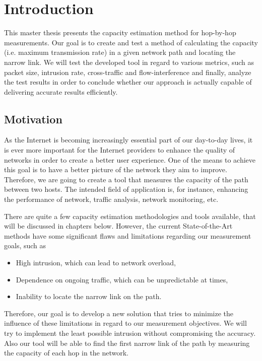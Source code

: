 \chapter{Introduction}
This master thesis presents the capacity estimation method for hop-by-hop measurements. Our goal is to create and test a method of calculating the capacity (i.e. maximum transmission rate) in a given network path and locating the narrow link.
We will test the developed tool in regard to various metrics, such as packet size, intrusion rate, cross-traffic and flow-interference and finally, analyze the test results in order to conclude whether our approach is actually capable of delivering accurate results efficiently. 

\section{Motivation}
As the Internet is becoming increasingly essential part of our day-to-day lives, it is ever more important for the Internet providers to enhance the quality of networks in order to create a better user experience. One of the means to achieve this goal is to have a better picture of the network they aim to improve. Therefore, we are going to create a tool that measures the capacity of the path between two hosts. The intended field of application is, for instance, enhancing the performance of network, traffic analysis, network monitoring, etc. 

There are quite a few capacity estimation methodologies and tools available, that will be discussed in chapters below. However, the current State-of-the-Art methods have some significant flaws and limitations regarding our measurement goals, such as  
\begin{itemize}
	\item High intrusion, which can lead to network overload,
	\item Dependence on ongoing traffic, which can be unpredictable at times,
	\item Inability to locate the narrow link on the path.
\end{itemize}

Therefore, our goal is to develop a new solution that tries to minimize the influence of these limitations in regard to our measurement objectives. We will try to implement the least possible intrusion without compromising the accuracy. Also our tool will be able to find the first narrow link of the path by measuring the capacity of each hop in the network. 

